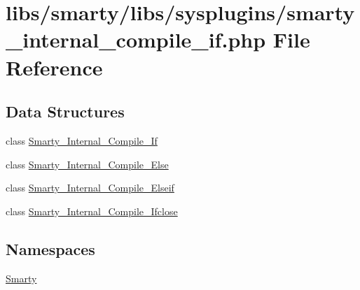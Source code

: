 \hypertarget{smarty__internal__compile__if_8php}{}\section{libs/smarty/libs/sysplugins/smarty\+\_\+internal\+\_\+compile\+\_\+if.php File Reference}
\label{smarty__internal__compile__if_8php}
\subsection*{Data Structures}
\begin{DoxyCompactItemize}
\item 
class \hyperlink{class_smarty___internal___compile___if}{Smarty\+\_\+\+Internal\+\_\+\+Compile\+\_\+\+If}
\item 
class \hyperlink{class_smarty___internal___compile___else}{Smarty\+\_\+\+Internal\+\_\+\+Compile\+\_\+\+Else}
\item 
class \hyperlink{class_smarty___internal___compile___elseif}{Smarty\+\_\+\+Internal\+\_\+\+Compile\+\_\+\+Elseif}
\item 
class \hyperlink{class_smarty___internal___compile___ifclose}{Smarty\+\_\+\+Internal\+\_\+\+Compile\+\_\+\+Ifclose}
\end{DoxyCompactItemize}
\subsection*{Namespaces}
\begin{DoxyCompactItemize}
\item 
 \hyperlink{namespace_smarty}{Smarty}
\end{DoxyCompactItemize}
